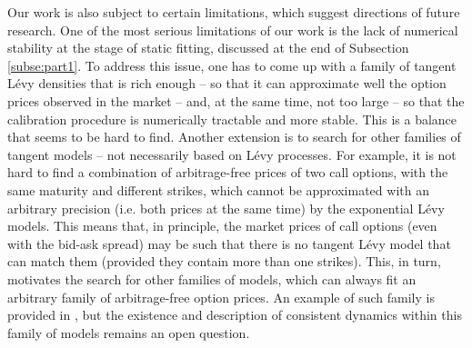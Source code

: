 \documentclass{article}
\numberwithin{equation}{section}
\begin{document}
 
Our work is also subject to certain limitations, which suggest directions of future research. 
One of the most serious limitations of our work is the lack of numerical stability at the stage of static fitting, discussed at the end of Subsection \ref{subse:part1}. To address this issue, one has to come up with a family of tangent L\'evy densities that is rich enough -- so that it can approximate well the option prices observed in the market -- and, at the same time, not too large -- so that the calibration procedure is numerically tractable and more stable. This is a balance that seems to be hard to find. Another extension is to search for other families of tangent models -- not necessarily based on L\'evy processes. For example, it is not hard to find a combination of arbitrage-free prices of two call options, with the same maturity and different strikes, which cannot be approximated with an arbitrary precision (i.e. both prices at the same time) by the exponential L\'evy models. This means that, in principle, the market prices of call options (even with the bid-ask spread) may be such that there is no tangent L\'evy model that can match them (provided they contain more than one strikes). This, in turn, motivates the search for other families of models, which can always fit an arbitrary family of arbitrage-free option prices. An example of such family is provided in \cite{LVG}, but the existence and description of consistent dynamics within this family of models remains an open question.
\end{document}
